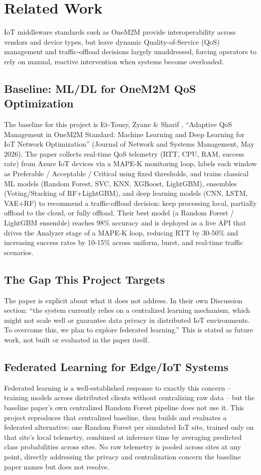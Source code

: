 \section{Related Work}
\label{sec:rw}

IoT middleware standards such as OneM2M provide interoperability across vendors and device types, but leave dynamic Quality-of-Service (QoS) management and traffic-offload decisions largely unaddressed, forcing operators to rely on manual, reactive intervention when systems become overloaded.

\subsection{Baseline: ML/DL for OneM2M QoS Optimization}
The baseline for this project is Et-Tousy, Zyane \& Sharif \cite{EtTousy26}, ``Adaptive QoS Management in OneM2M Standard: Machine Learning and Deep Learning for IoT Network Optimization'' (Journal of Network and Systems Management, May 2026). The paper collects real-time QoS telemetry (RTT, CPU, RAM, success rate) from Azure IoT devices via a MAPE-K monitoring loop, labels each window as Preferable / Acceptable / Critical using fixed thresholds, and trains classical ML models (Random Forest, SVC, KNN, XGBoost, LightGBM), ensembles (Voting/Stacking of RF+LightGBM), and deep learning models (CNN, LSTM, VAE+RF) to recommend a traffic-offload decision: keep processing local, partially offload to the cloud, or fully offload. Their best model (a Random Forest / LightGBM ensemble) reaches 98\% accuracy and is deployed as a live API that drives the Analyzer stage of a MAPE-K loop, reducing RTT by 30-50\% and increasing success rates by 10-15\% across uniform, burst, and real-time traffic scenarios.

\subsection{The Gap This Project Targets}
The paper is explicit about what it does not address. In their own Discussion section: ``the system currently relies on a centralized learning mechanism, which might not scale well or guarantee data privacy in distributed IoT environments. To overcome this, we plan to explore federated learning.'' This is stated as future work, not built or evaluated in the paper itself.

\subsection{Federated Learning for Edge/IoT Systems}
Federated learning is a well-established response to exactly this concern -- training models across distributed clients without centralizing raw data -- but the baseline paper's own centralized Random Forest pipeline does not use it. This project reproduces that centralized baseline, then builds and evaluates a federated alternative: one Random Forest per simulated IoT site, trained only on that site's local telemetry, combined at inference time by averaging predicted class probabilities across sites. No raw telemetry is pooled across sites at any point, directly addressing the privacy and centralization concern the baseline paper names but does not resolve.
